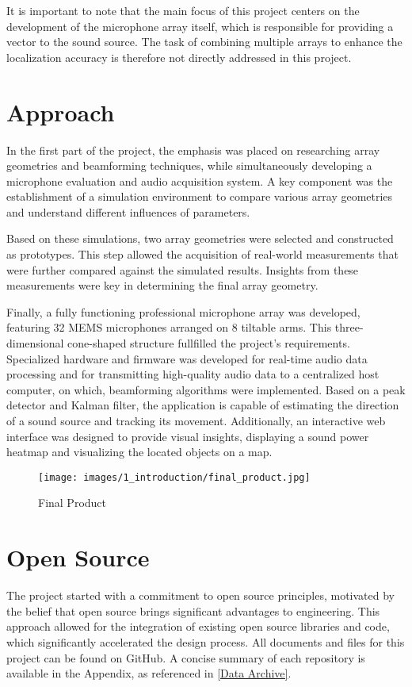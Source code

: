 
It is important to note that the main focus of this project centers on the development of the microphone array itself,
which is responsible for providing a vector to the sound source.
The task of combining multiple arrays to enhance the localization accuracy is therefore not directly addressed in this project.

\newpage
\section{Approach}
In the first part of the project, the emphasis was placed on researching array geometries and beamforming techniques,
while simultaneously developing a microphone evaluation and audio acquisition system.
A key component was the establishment of a simulation environment to compare various array geometries and understand different influences of parameters.

Based on these simulations, two array geometries were selected and constructed as prototypes.
This step allowed the acquisition of real-world measurements that were further compared against the simulated results.
Insights from these measurements were key in determining the final array geometry.

Finally, a fully functioning professional microphone array was developed, featuring 32 MEMS microphones arranged on 8 tiltable arms.
This three-dimensional cone-shaped structure fullfilled the project's requirements.
Specialized hardware and firmware was developed for real-time audio data processing and for transmitting high-quality audio data to a centralized host computer,
on which, beamforming algorithms were implemented.
Based on a peak detector and Kalman filter, the application is capable of estimating the direction of a sound source and tracking its movement.
Additionally, an interactive web interface was designed to provide visual insights, displaying a sound power heatmap and visualizing the located objects on a map.
\begin{figure}[h!]
	\centering
	\texttt{[image: images/1\_introduction/final\_product.jpg]}
	\caption{Final Product}
	\label{fig:final_product}
\end{figure}

\section{Open Source}
The project started with a commitment to open source principles, motivated by the belief that open source brings significant advantages to engineering.
This approach allowed for the integration of existing open source libraries and code, which significantly accelerated the design process.
All documents and files for this project can be found on GitHub.
A concise summary of each repository is available in the Appendix, as referenced in \ref{Data Archive}.

